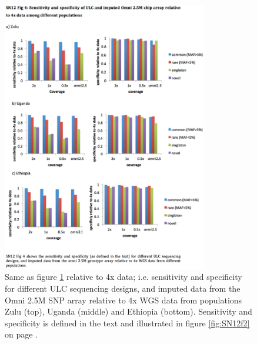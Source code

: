 \begin{figure}
\centering
\includegraphics[trim={0 4cm 0 0cm},clip,width=0.8\textwidth]{fig/SN12f4}
\caption[Sensitivity and specificity for each of 3 populations relative to 4x after down-sampling.]{Same as figure \ref{fig:SN12f4} relative to 4x data; i.e. sensitivity and specificity for different \gls{ULC} sequencing designs, and imputed data from the Omni 2.5M \gls{SNP} array relative to 4x \gls{WGS} data from populations Zulu (top), Uganda (middle) and Ethiopia (bottom). Sensitivity and specificity is defined in the text and illustrated in figure \ref{fig:SN12f2} on page \pageref{fig:SN12f2}.}
\label{fig:SN12f4}
\end{figure}